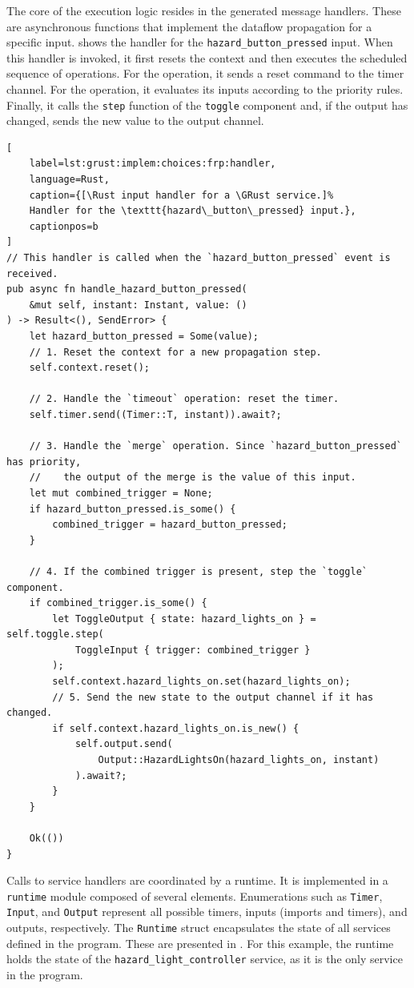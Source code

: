 The core of the execution logic resides in the generated message handlers. These are
asynchronous \Rust functions that implement the dataflow propagation for a specific
input.  shows the handler for the
\texttt{hazard\_button\_pressed} input.
%
When this handler is invoked, it first resets the context and then executes the scheduled
sequence of operations. For the  operation, it sends a reset command to
the timer channel. For the  operation, it evaluates its inputs according to
the priority rules. Finally, it calls the \texttt{step} function of the \texttt{toggle}
component and, if the output has changed, sends the new value to the output channel.

\begin{lstlisting}[
    label=lst:grust:implem:choices:frp:handler,
    language=Rust,
    caption={[\Rust input handler for a \GRust service.]%
    Handler for the \texttt{hazard\_button\_pressed} input.},
    captionpos=b
]
// This handler is called when the `hazard_button_pressed` event is received.
pub async fn handle_hazard_button_pressed(
    &mut self, instant: Instant, value: ()
) -> Result<(), SendError> {
    let hazard_button_pressed = Some(value);
    // 1. Reset the context for a new propagation step.
    self.context.reset();

    // 2. Handle the `timeout` operation: reset the timer.
    self.timer.send((Timer::T, instant)).await?;

    // 3. Handle the `merge` operation. Since `hazard_button_pressed` has priority,
    //    the output of the merge is the value of this input.
    let mut combined_trigger = None;
    if hazard_button_pressed.is_some() {
        combined_trigger = hazard_button_pressed;
    }

    // 4. If the combined trigger is present, step the `toggle` component.
    if combined_trigger.is_some() {
        let ToggleOutput { state: hazard_lights_on } = self.toggle.step(
            ToggleInput { trigger: combined_trigger }
        );
        self.context.hazard_lights_on.set(hazard_lights_on);
        // 5. Send the new state to the output channel if it has changed.
        if self.context.hazard_lights_on.is_new() {
            self.output.send(
                Output::HazardLightsOn(hazard_lights_on, instant)
            ).await?;
        }
    }

    Ok(())
}
\end{lstlisting}

Calls to service handlers are coordinated by a runtime. It is implemented in a \texttt{runtime}
module composed of several elements. Enumerations such as \texttt{Timer}, \texttt{Input}, and
\texttt{Output} represent all possible timers, inputs (imports and timers), and outputs,
respectively. The \texttt{Runtime} struct encapsulates the state of all services defined in the
\GRust program.
%
These are presented in . For this example,
the runtime holds the state of the \texttt{hazard\_light\_controller} service, as it is
the only service in the program.

